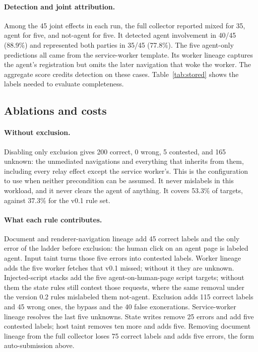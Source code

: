 \documentclass[11pt]{article}
\theoremstyle{definition}
\begin{document}
\paragraph{Detection and joint attribution.} Among the 45 joint effects in each run, the
full collector reported mixed for 35, agent for five, and not-agent for five. It
detected agent involvement in 40/45 (88.9\%) and represented both parties in 35/45
(77.8\%). The five agent-only predictions all came from the service-worker template. Its
worker lineage captures the agent's registration but omits the later navigation that
woke the worker. The aggregate score credits detection on these cases.
Table~\ref{tab:stored} shows the labels needed to evaluate completeness.

\subsection{Ablations and costs}


\paragraph{Without exclusion.} Disabling only exclusion gives 200 correct, 0 wrong,
5 contested, and 165 unknown: the unmediated navigations and everything that
inherits from them, including every relay effect except the service worker's.
This is the configuration to use when neither precondition can be assumed. It
never mislabels in this workload, and it never clears the agent of anything. It
covers 53.3\% of targets, against 37.3\% for the v0.1 rule set.

\paragraph{What each rule contributes.} Document and renderer-navigation lineage add
45 correct labels and the only error of the ladder before exclusion: the human
click on an agent page is labeled agent. Input taint turns those five errors into
contested labels. Worker lineage adds the five worker fetches that v0.1 missed;
without it they are unknown. Injected-script stacks add the five
agent-on-human-page script targets; without them the state rules still
contest those requests, where the same removal under the version 0.2 rules
mislabeled them not-agent. Exclusion
adds 115 correct labels and 45 wrong ones, the bypass and the 40 false
exonerations. Service-worker lineage resolves the last five unknowns. State
writes remove 25 errors and add five contested labels; host taint removes ten
more and adds five. Removing document lineage from the full collector loses 75
correct labels and adds five errors, the form auto-submission above.
\end{document}
